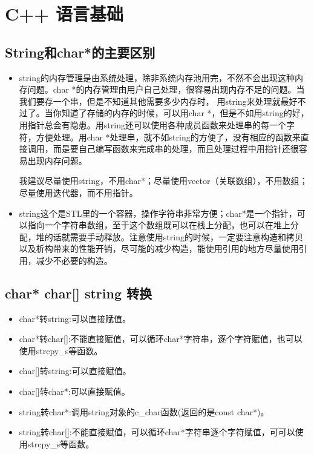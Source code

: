 \chapter{C++ 语言基础}
\section{String和char*的主要区别}
	\begin{itemize}
		\item string的内存管理是由系统处理，除非系统内存池用完，不然不会出现这种内存问题。char *的内存管理由用户自己处理，很容易出现内存不足的问题。当我们要存一个串，但是不知道其他需要多少内存时， 用string来处理就最好不过了。当你知道了存储的内存的时候，可以用char *，但是不如用string的好，用指针总会有隐患。用string还可以使用各种成员函数来处理串的每一个字符，方便处理。用char *处理串，就不如string的方便了，没有相应的函数来直接调用，而是要自己编写函数来完成串的处理，而且处理过程中用指针还很容易出现内存问题。

我建议尽量使用string，不用char*；尽量使用vector（关联数组），不用数组；尽量使用迭代器，而不用指针。
		\item string这个是STL里的一个容器，操作字符串非常方便；char*是一个指针，可以指向一个字符串数组，至于这个数组既可以在栈上分配，也可以在堆上分配，堆的话就需要手动释放。注意使用string的时候，一定要注意构造和拷贝以及析构带来的性能开销，尽可能的减少构造，能使用引用的地方尽量使用引用，减少不必要的构造。 
	\end{itemize}


\section{char* char[] string 转换}
	\begin{itemize}
		\item char*转string:可以直接赋值。
		\item char*转char[]:不能直接赋值，可以循环char*字符串，逐个字符赋值，也可以使用strcpy\_s等函数。
		\item char[]转string:可以直接赋值。
		\item char[]转char*:可以直接赋值。
		\item string转char*:调用string对象的c\_char函数(返回的是const char*)。
		\item string转char[]:不能直接赋值，可以循环char*字符串逐个字符赋值，可可以使用strcpy\_s等函数。
	\end{itemize}


